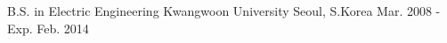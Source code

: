 

\begin{cventries}

  \cventry
    {B.S. in Electric Engineering} %
    {Kwangwoon University} %
    {Seoul, S.Korea} %
    {Mar. 2008 - Exp. Feb. 2014} %
    {}

\end{cventries}
